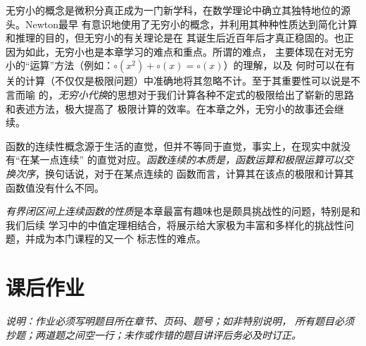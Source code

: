 无穷小的概念是微积分真正成为一门新学科，在数学理论中确立其独特地位的源头。Newton最早
有意识地使用了无穷小的概念，并利用其种种性质达到简化计算和推理的目的，但无穷小的有关理论是在
其诞生后近百年后才真正稳固的。也正因为如此，无穷小也是本章学习的难点和重点。所谓的难点，
主要体现在对无穷小的“运算”方法（例如：$\circ(x^2)+\circ(x)=\circ(x)$）的理解，以及
何时可以在有关的计算（不仅仅是极限问题）中准确地将其忽略不计。至于其重要性可以说是不言而喻
的，{\it 无穷小代换}的思想对于我们计算各种不定式的极限给出了崭新的思路和表述方法，极大提高了
极限计算的效率。在本章之外，无穷小的故事还会继续。

函数的连续性概念源于生活的直觉，但并不等同于直觉，事实上，在现实中就没有“在某一点连续”
的直觉对应。{\it 函数连续的本质是，函数运算和极限运算可以交换次序}，换句话说，对于在某点连续的
函数而言，计算其在该点的极限和计算其函数值没有什么不同。

{\it 有界闭区间上连续函数的性质}是本章最富有趣味也是颇具挑战性的问题，特别是和我们后续
学习中的中值定理相结合，将展示给大家极为丰富和多样化的挑战性问题，并成为本门课程的又一个
标志性的难点。

\newpage

\section*{课后作业}
{\b\it 说明：作业必须写明题目所在章节、页码、题号；如非特别说明，
所有题目必须抄题；两道题之间空一行；未作或作错的题目讲评后务必及时订正。}

